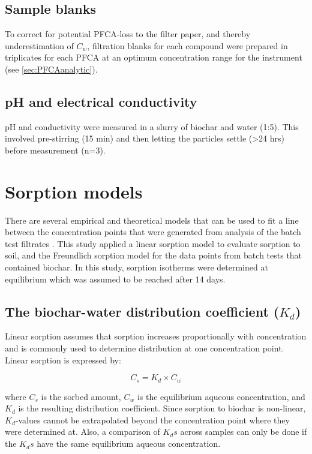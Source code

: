 \subsection{Sample blanks \label{sec:blanks}}
To correct for potential PFCA-loss to the filter paper, and thereby underestimation of $C_w$, filtration blanks for each compound were prepared in triplicates for each PFCA at an optimum concentration range for the instrument (see \cref{sec:PFCAanalytic}).

\subsection{pH and electrical conductivity}
pH and conductivity were measured in a slurry of biochar and water (1:5). This involved pre-stirring (15 min) and then letting the particles settle (\textgreater 24 hrs) before measurement (n=3).

\section{Sorption models}
There are several empirical and theoretical models that can be used to fit a line between the concentration points that were generated from analysis of the batch test filtrates \citep{wang2020adsorption}. This study applied a linear sorption model to evaluate sorption to soil, and the Freundlich sorption model for the data points from batch tests that contained biochar. In this study, sorption isotherms were determined at equilibrium which was assumed to be reached after 14 days.

\subsection{The biochar-water distribution coefficient ($K_d$)}
Linear sorption assumes that sorption increases proportionally with concentration and is commonly used to determine distribution at one concentration point. Linear sorption is expressed by: 

\begin{equation}\label{eq:linear}
C_s = K_d \times C_w
\end{equation}

where $C_s$ is the sorbed amount, $C_w$ is the equilibrium aqueous concentration, and $K_d$ is the resulting distribution coefficient. Since sorption to biochar is non-linear, $K_d$-values cannot be extrapolated beyond the concentration point where they were determined at. Also, a comparison of $K_ds$ across samples can only be done if the $K_ds$ have the same equilibrium aqueous concentration.

